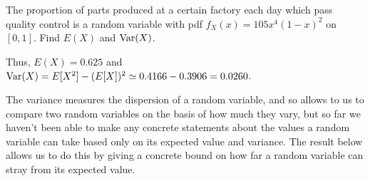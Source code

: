 \begin{examp}The proportion of parts produced at a certain factory each day which pass quality control is a random variable with pdf $f_X(x) = 105x^4(1-x)^2$ on $[0,1]$. Find $E(X)$ and $\operatorname{Var}(X)$.
\par
\noindent Thus, $E(X) = 0.625$ and $\operatorname{Var}(X) = E[X^2] - (E[X])^2 \simeq 0.4166 - 0.3906 = 0.0260$. 
\end{examp}
\par
The variance measures the dispersion of a random variable, and so allows to us to compare two random variables on the basis of how much they vary, but so far we haven't been able to make any concrete statements about the values a random variable can take based only on its expected value and variance. The result below allows us to do this by giving a concrete bound on how far a random variable can stray from its expected value.

